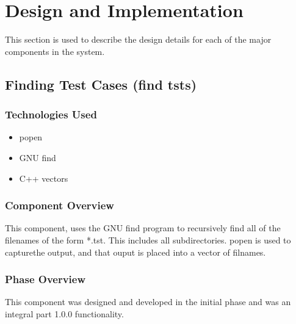 \chapter{Design  and Implementation}
This section is used to describe the design details for each of the major components in the system.


\section{Finding Test Cases (find tsts)}

\subsection{Technologies  Used}
\begin{itemize}
    \item popen
    \item GNU find
    \item C++ vectors
\end{itemize}
\subsection{Component  Overview}
This component, uses the GNU find program to recursively find all of the filenames of the form *.tst. This includes all subdirectories. popen is used to capturethe output, and that ouput is placed into a vector of filnames.

\subsection{Phase Overview}
This component was designed and developed in the initial phase and was an integral part 1.0.0 functionality.





